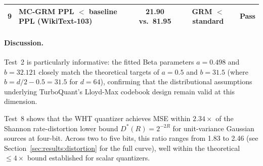 \begin{table}[ht]
\begin{tabular}{@{}c>{\raggedright\arraybackslash}p{4.8cm}ccc@{}}
9 & MC-GRM PPL $<$ baseline PPL (WikiText-103)
  & 21.90 vs.\ 81.95 & GRM $<$ standard & Pass \\
\bottomrule
\end{tabular}
\vspace{-4pt}
\end{table}

\paragraph{Discussion.}
Test~2 is particularly informative: the fitted Beta parameters
$a = 0.498$ and $b = 32.121$ closely match the theoretical targets of
$a = 0.5$ and $b = 31.5$ (where $b = d/2 - 0.5 = 31.5$ for $d = 64$),
confirming that the distributional assumptions underlying TurboQuant's
Lloyd-Max codebook design remain valid at this dimension.

Test~8 shows that the WHT quantizer achieves MSE within $2.34{\times}$
of the Shannon rate-distortion lower bound $D^*(R) = 2^{-2R}$ for
unit-variance Gaussian sources at four-bit.
Across two to five bits, this ratio ranges from 1.83 to 2.46
(see Section~\ref{sec:results:distortion} for the full curve), well
within the theoretical $\leq 4{\times}$ bound established for scalar
quantizers.
